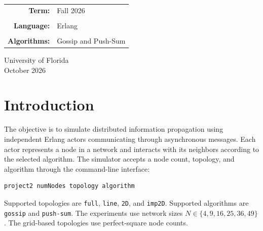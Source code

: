 \documentclass[11pt]{article}
\begin{document}
\begin{titlepage}
\begin{center}
{\begin{tabular}{r l}
\textbf{Term:} & Fall 2026\\\\

\textbf{Language:} & Erlang\\\\

\textbf{Algorithms:} & Gossip and Push-Sum

\end{tabular}

}

\vfill

{\small University of Florida\\[2pt]October 2026}

\end{center}

\end{titlepage}

\tableofcontents
\clearpage
\clearpage
{}
\hypersetup{pageanchor=true}
\begin{abstract}
This project implements asynchronous Gossip and Push-Sum simulations
using Erlang actors. Four network topologies are supported: full,
line, two-dimensional grid, and imperfect two-dimensional grid.
A centralized statistics actor collects convergence information and
records elapsed time. Baseline experiments evaluate both algorithms
across network sizes from 4 to 49 nodes. An additional 360-trial
experiment investigates how changing the local Gossip reception
threshold affects convergence. In the baseline experiments, all 72
Push-Sum trials succeeded, whereas 39 of 72 Gossip trials succeeded.
The threshold experiment demonstrates that increasing the local
reception threshold substantially improves observed Gossip success,
particularly for larger and less-connected networks.
\end{abstract}
\par
\section{Introduction}
The objective is to simulate distributed information propagation
using independent Erlang actors communicating through asynchronous
messages. Each actor represents a node in a network and interacts
with its neighbors according to the selected algorithm.
The simulator accepts a node count, topology, and algorithm through
the command-line interface:
\par
\begin{verbatim}
project2 numNodes topology algorithm
\end{verbatim}
Supported topologies are \texttt{full}, \texttt{line}, \texttt{2D},
and \texttt{imp2D}. Supported algorithms are \texttt{gossip} and
\texttt{push-sum}. The experiments use network sizes
\(N \in \{4,9,16,25,36,49\}\). The grid-based topologies use
perfect-square node counts.
\par
\end{document}
